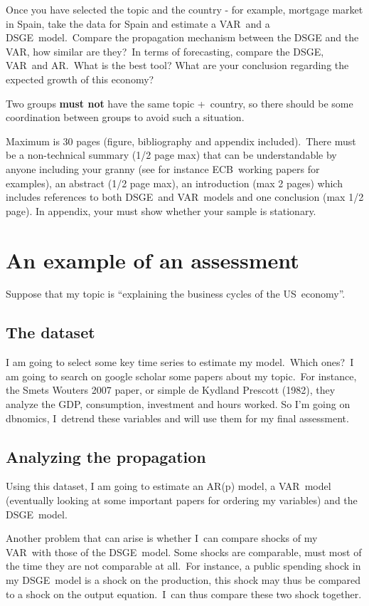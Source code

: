 \documentclass[a4paper,12pt]{article}%
\begin{document}
Once you have selected the topic and the country - for example, mortgage
market in Spain, take the data for Spain and estimate a VAR\ and a
DSGE\ model.\ Compare the propagation mechanism between the DSGE and the VAR,
how similar are they?\ In terms of forecasting, compare the DSGE, VAR\ and
AR.\ What is the best tool? What are your conclusion regarding the expected
growth of this economy?

Two groups \textbf{must not} have the same topic +\ country, so there should
be some coordination between groups to avoid such a situation.

Maximum is 30 pages (figure, bibliography and appendix included).\ There must
be a non-technical summary (1/2 page max) that can be understandable by anyone
including your granny (see for instance ECB\ working papers for examples), an
abstract (1/2 page max), an introduction (max 2 pages) which includes
references to both DSGE\ and VAR\ models and one conclusion (max 1/2 page). In
appendix, your must show whether your sample is stationary.

\section{An example of an assessment}

Suppose that my topic is \textquotedblleft explaining the business cycles of
the US\ economy\textquotedblright.

\subsection{The dataset}

I am going to select some key time series to estimate my model.\ Which
ones?\ I am going to search on google scholar some papers about my topic.\ For
instance, the Smets Wouters 2007 paper, or simple de Kydland Prescott (1982),
they analyze the GDP, consumption, investment and hours worked. So I'm going
on dbnomics, I\ detrend these variables and will use them for my final assessment.

\subsection{Analyzing the propagation}

Using this dataset, I am going to estimate an AR(p) model, a VAR\ model
(eventually looking at some important papers for ordering my variables) and
the DSGE\ model.

Another problem that can arise is whether I\ can compare shocks of my
VAR\ with those of the DSGE\ model. Some shocks are comparable, must most of
the time they are not comparable at all.\ For instance, a public spending
shock in my DSGE\ model is a shock on the production, this shock may thus be
compared to a shock on the output equation.\ I\ can thus compare these two
shock together.
\end{document}
